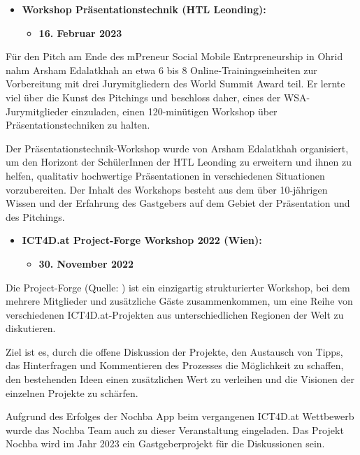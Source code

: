\begin{itemize}
    \item \textbf{Workshop Präsentationstechnik (HTL Leonding):}
          \begin{itemize}
              \item \textbf{16. Februar 2023}
          \end{itemize}
\end{itemize}

Für den Pitch am Ende des mPreneur Social Mobile Entrpreneurship in Ohrid nahm Arsham Edalatkhah an etwa 6 bis 8 Online-Trainingseinheiten zur Vorbereitung mit drei Jurymitgliedern des World Summit Award teil. Er lernte viel über die Kunst des Pitchings und beschloss daher, eines der WSA-Jurymitglieder einzuladen, einen 120-minütigen Workshop über Präsentationstechniken zu halten. 

Der Präsentationstechnik-Workshop wurde von Arsham Edalatkhah organisiert, um den Horizont der SchülerInnen der HTL Leonding zu erweitern und ihnen zu helfen, qualitativ hochwertige Präsentationen in verschiedenen Situationen vorzubereiten. Der Inhalt des Workshops besteht aus dem über 10-jährigen Wissen und der Erfahrung des Gastgebers auf dem Gebiet der Präsentation und des Pitchings.

\begin{itemize}
    \item \textbf{ICT4D.at Project-Forge Workshop 2022 (Wien):}
          \begin{itemize}
              \item \textbf{30. November 2022}
          \end{itemize}
\end{itemize}

Die Project-Forge (Quelle: \cite{ict4d-project-forge-report} ) ist ein einzigartig strukturierter Workshop, bei dem mehrere Mitglieder und zusätzliche Gäste zusammenkommen, um eine Reihe von verschiedenen ICT4D.at-Projekten aus unterschiedlichen Regionen der Welt zu diskutieren. 

Ziel ist es, durch die offene Diskussion der Projekte, den Austausch von Tipps, das Hinterfragen und Kommentieren des Prozesses die Möglichkeit zu schaffen, den bestehenden Ideen einen zusätzlichen Wert zu verleihen und die Visionen der einzelnen Projekte zu schärfen.

Aufgrund des Erfolges der Nochba App beim vergangenen ICT4D.at Wettbewerb wurde das Nochba Team auch zu dieser Veranstaltung eingeladen. Das Projekt Nochba wird im Jahr 2023 ein Gastgeberprojekt für die Diskussionen sein.

